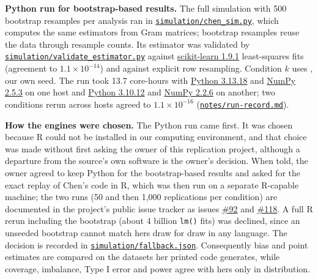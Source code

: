 \textbf{Python run for bootstrap-based results.} The full simulation with 500 bootstrap resamples per analysis ran in \href{https://github.com/alectionary/vibe-math/blob/master/formalization/chen-rdd-mediation/simulation/chen_sim.py}{\nolinkurl{simulation/chen_sim.py}}, which computes the same estimators from Gram matrices; bootstrap resamples reuse the data through resample counts. Its estimator was validated by \href{https://github.com/alectionary/vibe-math/blob/master/formalization/chen-rdd-mediation/simulation/validate_estimator.py}{\nolinkurl{simulation/validate_estimator.py}} against \href{https://scikit-learn.org/}{scikit-learn 1.9.1} least-squares fits \citep{pedregosa2011} (agreement to $1.1\times 10^{-14}$) and against explicit row resampling. Condition $k$ uses \texttt{}, our own seed. The run took 13.7 core-hours with \href{https://www.python.org/}{Python 3.13.18} \citep{pythonsoftware} and \href{https://numpy.org/}{NumPy 2.5.3} \citep{harris2020} on one host and \href{https://www.python.org/}{Python 3.10.12} \citep{pythonsoftware} and \href{https://numpy.org/}{NumPy 2.2.6} \citep{harris2020} on another; two conditions rerun across hosts agreed to $1.1\times 10^{-16}$ (\href{https://github.com/alectionary/vibe-math/blob/master/formalization/chen-rdd-mediation/notes/run-record.md}{\nolinkurl{notes/run-record.md}}).

\textbf{How the engines were chosen.} The Python run came first. It was chosen because R could not be installed in our computing environment, and that choice was made without first asking the owner of this replication project, although a departure from the source's own software is the owner's decision. When told, the owner agreed to keep Python for the bootstrap-based results and asked for the exact replay of Chen's code in R, which was then run on a separate R-capable machine; the two runs (50 and then 1,000 replications per condition) are documented in the project's public issue tracker as issues \href{https://github.com/alectionary/vibe-math/issues/92}{\#92} and \href{https://github.com/alectionary/vibe-math/issues/118}{\#118}. A full R rerun including the bootstrap (about 4 billion \texttt{lm()} fits) was declined, since an unseeded bootstrap cannot match hers draw for draw in any language. The decision is recorded in \href{https://github.com/alectionary/vibe-math/blob/master/formalization/chen-rdd-mediation/simulation/fallback.json}{\nolinkurl{simulation/fallback.json}}. Consequently bias and point estimates are compared on the datasets her printed code generates, while coverage, imbalance, Type I error and power agree with hers only in distribution.


